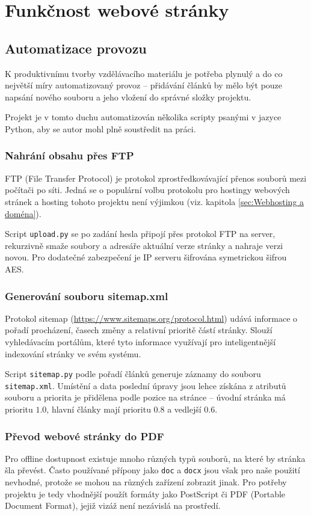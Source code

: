 \documentclass[a4paper, 12pt]{article}
\begin{document}
  \section{Funkčnost webové stránky}

  \subsection{Automatizace provozu}
  K produktivnímu tvorby vzdělávacího materiálu je potřeba plynulý a do co největší míry automatizovaný provoz -- přidávání článků by mělo být pouze napsání nového souboru a jeho vložení do správné složky projektu.

  Projekt je v tomto duchu automatizován několika scripty psanými v jazyce Python, aby se autor mohl plně soustředit na práci.


  \subsubsection{Nahrání obsahu přes FTP}
  FTP (File Transfer Protocol) je protokol zprostředkovávající přenos souborů mezi počítači po síti. Jedná se o populární volbu protokolu pro hostingy webových stránek a hosting tohoto projektu není výjimkou (viz. kapitola \ref{sec:Webhosting a doména}).

  Script \texttt{upload.py} se po zadání hesla připojí přes protokol FTP na server, rekurzivně smaže soubory a adresáře aktuální verze stránky a nahraje verzi novou. Pro dodatečné zabezpečení je IP serveru šifrována symetrickou šifrou AES.


  \subsubsection{Generování souboru sitemap.xml}
  Protokol sitemap (\url{https://www.sitemaps.org/protocol.html}) udává informace o pořadí procházení, časech změny a relativní prioritě částí stránky. Slouží vyhledávacím portálům, které tyto informace využívají pro inteligentnější indexování stránky ve svém systému.

  Script \texttt{sitemap.py} podle pořadí článků generuje záznamy do souboru \texttt{sitemap.xml}. Umístění a data poslední úpravy jsou lehce získána z atributů souboru a priorita je přidělena podle pozice na stránce -- úvodní stránka má prioritu $1.0$, hlavní články mají prioritu $0.8$ a vedlejší $0.6$.


  \subsubsection{Převod webové stránky do PDF}
  Pro offline dostupnost existuje mnoho různých typů souborů, na které by stránka šla převést. Často používané přípony jako \texttt{doc} a \texttt{docx} jsou však pro naše použití nevhodné, protože se mohou na různých zařízení zobrazit jinak. Pro potřeby projektu je tedy vhodnější použít formáty jako PostScript či PDF (Portable Document Format), jejiž vizáž není nezávislá na prostředí\cite{history-of-pdf}.
\end{document}
